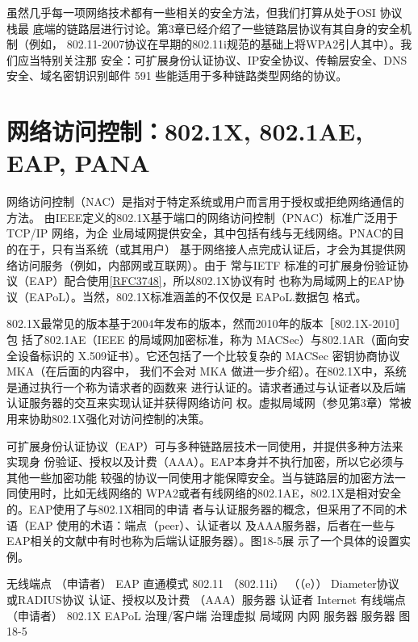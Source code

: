 虽然几乎每一项网络技术都有一些相关的安全方法，但我们打算从处于OSI 协议栈最
底端的链路层进行讨论。第3章已经介绍了一些链路层协议有其自身的安全机制（例如，
802.11-2007协议在早期的802.11i规范的基础上将WPA2引人其中）。我们应当特别关注那
安全：可扩展身份认证协议、IP安全协议、传輸层安全、DNS 安全、域名密钥识别邮件 591
些能适用于多种链路类型网络的协议。

\section{网络访问控制：802.1X, 802.1AE, EAP, PANA}

网络访问控制（NAC）是指对于特定系统或用户而言用于授权或拒绝网络通信的方法。
由IEEE定义的802.1X基于端口的网络访问控制（PNAC）标准广泛用于 TCP/IP 网络，为企
业局域网提供安全，其中包括有线与无线网络。PNAC的目的在于，只有当系统（或其用户）
基于网络接人点完成认证后，才会为其提供网络访问服务（例如，内部网或互联网）。由于
常与IETF 标准的可扩展身份验证协议（EAP）配合使用\href{https://www.rfc-editor.org/rfc/rfc3748}{[RFC3748]}，所以802.1X协议有时
也称为局域网上的EAP协议（EAPoL）。当然，802.1X标准涵盖的不仅仅是 EAPoL.数据包
格式。

802.1X最常见的版本基于2004年发布的版本，然而2010年的版本［802.1X-2010］包
括了802.1AE（IEEE 的局域网加密标准，称为 MACSec）与802.1AR（面向安全设备标识的
X.509证书）。它还包括了一个比较复杂的 MACSec 密钥协商协议 MKA（在后面的内容中，
我们不会对 MKA 做进一步介绍）。在802.1X中，系统是通过执行一个称为请求者的函数来
进行认证的。请求者通过与认证者以及后端认证服务器的交互来实现认证并获得网络访问
权。虚拟局域网（参见第3章）常被用来协助802.1X强化对访问控制的决策。

可扩展身份认证协议（EAP）可与多种链路层技术一同使用，并提供多种方法来实现身
份验证、授权以及计费（AAA）。EAP本身并不执行加密，所以它必须与其他一些加密功能
较强的协议一同使用才能保障安全。当与链路层的加密方法一同使用时，比如无线网络的
WPA2或者有线网络的802.1AE，802.1X是相对安全的。EAP使用了与802.1X相同的申请
者与认证服务器的概念，但采用了不同的术语（EAP 使用的术语：端点（peer）、认证者以
及AAA服务器，后者在一些与EAP相关的文献中有时也称为后端认证服务器）。图18-5展
示了一个具体的设置实例。

无线端点
（申请者）
EAP
直通模式
802.11
（802.11i）
（（e））
Diameter协议
或RADIUS协议
认证、授权以及计费
（AAA）服务器
认证者
Internet
有线端点
（申请者）
802.1X
EAPoL
治理/客户端
治理虚拟
局域网
内网
服务器
服务器
图18-5

